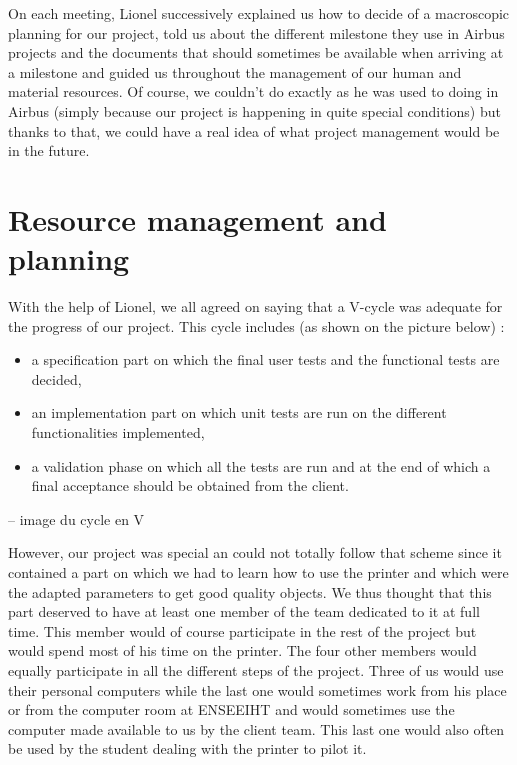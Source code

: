 \documentclass{report}
\begin{document}
On each meeting, Lionel successively explained us how to decide of a macroscopic planning for our project, told us about the different milestone they use in Airbus projects and the documents that should sometimes be available when arriving at a milestone and guided us throughout the management of our human and material resources. Of course, we couldn't do exactly as he was used to doing in Airbus (simply because our project is happening in quite special conditions) but thanks to that, we could have a real idea of what project management would be in the future. 

\section{Resource management and planning}

With the help of Lionel, we all agreed on saying that a V-cycle was adequate for the progress of our project. This cycle includes (as shown on the picture below) :

\begin{itemize}
\item a specification part on which the final user tests and the functional tests are decided,
\item an implementation part on which unit tests are run on the different functionalities implemented,
\item a validation phase on which all the tests are run and at the end of which a final acceptance should be obtained from the client.
\end{itemize}

\bigskip
-- image du cycle en V
\bigskip

However, our project was special an could not totally follow that scheme since it contained a part on which we had to learn how to use the printer and which were the adapted parameters to get good quality objects. We thus thought that this part deserved to have at least one member of the team dedicated to it at full time. This member would of course participate in the rest of the project but would spend most of his time on the printer. The four other members would equally participate in all the different steps of the project. Three of us would use their personal computers while the last one would sometimes work from his place or from the computer room at ENSEEIHT and would sometimes use the computer made available to us by the client team. This last one would also often be used by the student dealing with the printer to pilot it.
\end{document}
